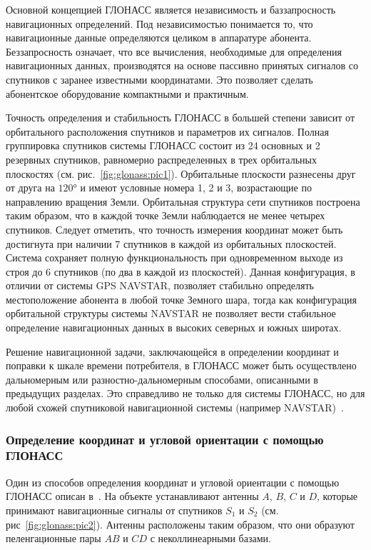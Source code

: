 \documentclass[../main.tex]{subfiles}
\begin{document}
Основной концепцией ГЛОНАСС является независимость и баззапросность навигационных определений. Под независимостью понимается то, что навигационные данные определяются целиком в аппаратуре абонента. Беззапросность означает, что все вычисления, необходимые для определения навигационных данных, производятся на основе пассивно принятых сигналов со спутников с заранее известными координатами. Это позволяет сделать абонентское оборудование компактными и практичным.

Точность определения и стабильность ГЛОНАСС в большей степени зависит от орбитального расположения спутников и параметров их сигналов. Полная группировка спутников системы ГЛОНАСС состоит из 24 основных и 2 резервных спутников, равномерно распределенных в трех орбитальных плоскостях (см. рис.~\ref{fig:glonass:pic1}). Орбитальные плоскости разнесены друг от друга на $\ang{120}$ и имеют условные номера 1, 2 и 3, возрастающие по направлению вращения Земли. Орбитальная структура сети спутников построена таким образом, что в каждой точке Земли наблюдается не менее четырех спутников. Следует отметить, что точность измерения координат может быть достигнута при наличии 7 спутников в каждой из орбитальных плоскостей. Система сохраняет полную функциональность при одновременном выходе из строя до 6 спутников (по два в каждой из плоскостей). Данная конфигурация, в отличии от системы GPS NAVSTAR, позволяет стабильно определять местоположение абонента в любой точке Земного шара, тогда как конфигурация орбитальной структуры системы NAVSTAR не позволяет вести стабильное определение навигационных данных в высоких северных и южных широтах.

Решение навигационной задачи, заключающейся в определении координат и поправки к шкале времени потребителя, в ГЛОНАСС может быть осуществлено дальномерным или разностно-дальномерным способами, описанными в предыдущих разделах. Это справедливо не только для системы ГЛОНАСС, но для любой схожей спутниковой навигационной системы (например NAVSTAR)~\cite{GOST-GLONASS:2009}.

\subsubsection{Определение координат и угловой ориентации с помощью ГЛОНАСС}
Один из способов определения координат и угловой ориентации с помощью ГЛОНАСС описан в~\cite{STEPANOV:2006}. На объекте устанавливают антенны $A$, $B$, $C$ и $D$, которые принимают навигационные сигналы от спутников $S_1$ и $S_2$ (см. рис~\ref{fig:glonass:pic2}). Антенны расположены таким образом, что они образуют пеленгационные пары $AB$ и $CD$ с неколлинеарными базами.
\end{document}
